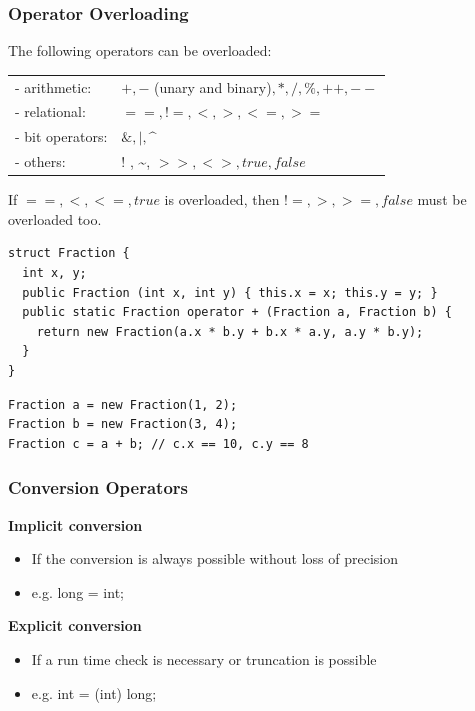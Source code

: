\newpage
\subsubsection{Operator Overloading}
The following operators can be overloaded:
\begin{multicols}{2}
	\begin{tabular}{lp{5cm}}
		- arithmetic:    & $+, -$ (unary and binary)$ , *, /,\%, ++, -- $ \\
		- relational:    & $==, !=, <, >, <=, >=$                       \\
		- bit operators: & $\&,|, \text{\textasciicircum}$              \\
		- others:        & $!$ , \textasciitilde, $>>,<>, true, false$  \\
	\end{tabular}

\columnbreak
  If $==, <, <=, true$ is overloaded, then $!=, >, >=, false$ must be overloaded too.

\end{multicols}	

\begin{multicols}{2}
\begin{lstlisting}
struct Fraction {
  int x, y;
  public Fraction (int x, int y) { this.x = x; this.y = y; }
  public static Fraction operator + (Fraction a, Fraction b) {
    return new Fraction(a.x * b.y + b.x * a.y, a.y * b.y);
  }
}
\end{lstlisting}
\columnbreak
\begin{lstlisting}
Fraction a = new Fraction(1, 2);
Fraction b = new Fraction(3, 4);
Fraction c = a + b; // c.x == 10, c.y == 8
\end{lstlisting}
\end{multicols}

\subsubsection{Conversion Operators}
\begin{multicols}{2}
\textbf{Implicit conversion}
\begin{itemize}
	\item If the conversion is always possible without loss of precision
	\item e.g. long = int;
\end{itemize}
\columnbreak
\textbf{Explicit conversion}
\begin{itemize}
	\item If a run time check is necessary or truncation is possible
	\item e.g. int = (int) long;
\end{itemize}
\end{multicols}


